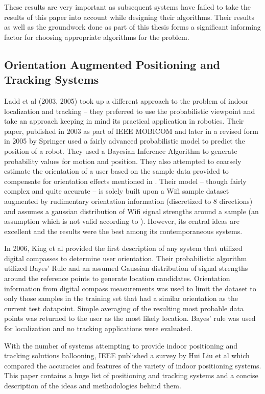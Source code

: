 These results are very important as subsequent systems have failed to take the results of this paper into account while designing their algorithms. Their results as well as the groundwork done as part of this thesis forms a significant informing factor for choosing appropriate algorithms for the problem.


\subsection{Orientation Augmented Positioning and Tracking Systems}

Ladd et al (2003, 2005)\cite{Ladd}  took up a different approach to the problem of indoor localization and tracking – they preferred to use the probabilistic viewpoint and take an approach keeping in mind its practical application in robotics. Their paper, published in 2003 as part of IEEE MOBICOM and later in a revised form in 2005 by Springer used a fairly advanced probabilistic model to predict the position of a robot. They used a Bayesian Inference Algorithm to generate probability values for motion and position. They also attempted to coarsely estimate the orientation of a user based on the sample data provided to compensate for orientation effects mentioned in \cite{KStats}. Their model – though fairly complex and quite accurate – is solely built upon a Wifi sample dataset augmented by rudimentary orientation information (discretized to 8 directions) and assumes a gaussian distribution of Wifi signal strengths around a sample (an assumption which is not valid according to \cite{KStats}). However, its central ideas are excellent and the results were the best among its contemporaneous systems.

In 2006, King et al\cite{King} provided the first description of any system that utilized digital compasses to determine user orientation. Their probabilistic algorithm utilized Bayes’ Rule and an assumed Gaussian distribution of signal strengths around the reference points to generate location candidates. Orientation information from digital compass measurements was used to limit the dataset to only those samples in the training set that had a similar orientation as the current test datapoint. Simple averaging of the resulting most probable data points was returned to the user as the most likely location. Bayes' rule was used for localization and no tracking applications were evaluated.

With the number of systems attempting to provide indoor positioning and tracking solutions ballooning, IEEE published a survey\cite{Survey2007} by Hui Liu et al which compared the accuracies and features of the variety of indoor positioning systems. This paper contains a huge list of positioning and tracking systems and a concise description of the ideas and methodologies behind them.

